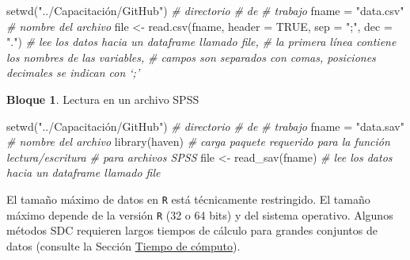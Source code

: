 \documentclass[
]{book}
\newenvironment{Shaded}{\begin{snugshade}}{\end{snugshade}}
\newcommand{\AttributeTok}[1]{\textcolor[rgb]{0.77,0.63,0.00}{#1}}
\newcommand{\CommentTok}[1]{\textcolor[rgb]{0.56,0.35,0.01}{\textit{#1}}}
\newcommand{\ConstantTok}[1]{\textcolor[rgb]{0.00,0.00,0.00}{#1}}
\newcommand{\FunctionTok}[1]{\textcolor[rgb]{0.00,0.00,0.00}{#1}}
\newcommand{\NormalTok}[1]{#1}
\newcommand{\OtherTok}[1]{\textcolor[rgb]{0.56,0.35,0.01}{#1}}
\newcommand{\StringTok}[1]{\textcolor[rgb]{0.31,0.60,0.02}{#1}}
\theoremstyle{definition}
\theoremstyle{definition}
\newtheorem{example}{Bloque}[chapter]
\theoremstyle{definition}
\theoremstyle{definition}
\theoremstyle{remark}
\begin{document}
\begin{Shaded}
\begin{Highlighting}[]
\FunctionTok{setwd}\NormalTok{(}\StringTok{"../Capacitación/GitHub"}\NormalTok{) }\CommentTok{\# directorio }
                                                                              \CommentTok{\# de}
                                                                              \CommentTok{\# trabajo}
\NormalTok{fname }\OtherTok{=} \StringTok{"data.csv"} \CommentTok{\# nombre del archivo}
\NormalTok{file }\OtherTok{\textless{}{-}} \FunctionTok{read.csv}\NormalTok{(fname, }\AttributeTok{header =} \ConstantTok{TRUE}\NormalTok{, }\AttributeTok{sep =} \StringTok{";"}\NormalTok{, }\AttributeTok{dec =} \StringTok{"."}\NormalTok{)}
\CommentTok{\# lee los datos hacia un dataframe llamado file,}
\CommentTok{\# la primera línea contiene los nombres de las variables,}
\CommentTok{\# campos son separados con comas, posiciones decimales se indican con ‘;’}
\end{Highlighting}
\end{Shaded}

\begin{example}
\protect\hypertarget{exm:bloqueMicro5}{}\label{exm:bloqueMicro5}Lectura en un archivo SPSS
\end{example}

\begin{Shaded}
\begin{Highlighting}[]
\FunctionTok{setwd}\NormalTok{(}\StringTok{"../Capacitación/GitHub"}\NormalTok{) }\CommentTok{\# directorio }
                                                                              \CommentTok{\# de}
                                                                              \CommentTok{\# trabajo}
\NormalTok{fname }\OtherTok{=} \StringTok{"data.sav"} \CommentTok{\# nombre del archivo}
\FunctionTok{library}\NormalTok{(haven) }\CommentTok{\# carga paquete requerido para la función lectura/escritura}
               \CommentTok{\# para archivos SPSS}
\NormalTok{file }\OtherTok{\textless{}{-}} \FunctionTok{read\_sav}\NormalTok{(fname)}
\CommentTok{\# lee los datos hacia un dataframe llamado file}
\end{Highlighting}
\end{Shaded}

El tamaño máximo de datos en \texttt{R} está técnicamente restringido. El tamaño máximo depende de la versión \texttt{R} (32 o 64 bits) y del sistema operativo. Algunos métodos SDC requieren largos tiempos de cálculo para grandes conjuntos de datos (consulte la Sección \protect\hyperlink{tiempo-de-cuxf3mputo}{Tiempo de cómputo}).
\end{document}
